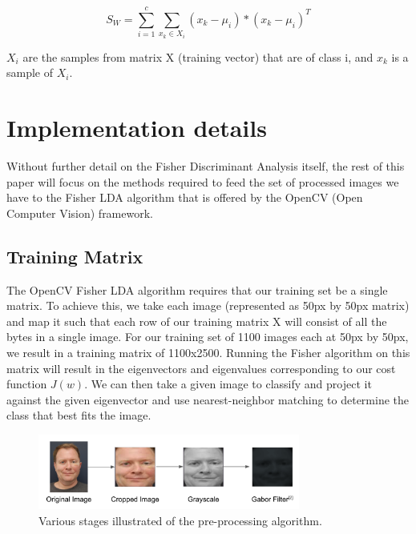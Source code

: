 \documentclass[12pt, conference]{IEEEtran}
\begin{document}
\begin{equation}
	S_W = \sum_{i=1}^{c} \sum_{x_k \in X_i} (x_k - \mu_i) * (x_k - \mu_i)^T
\end{equation}

$X_i$ are the samples from matrix X (training vector) that are of class i, and $x_k$ is a sample of $X_i$.


\section{Implementation details} \label{sec:Basics}
Without further detail on the Fisher Discriminant Analysis itself, the rest of this paper will focus on the methods required to feed the set of processed images we have to the Fisher LDA algorithm that is offered by the OpenCV (Open Computer Vision) framework.  

\subsection{Training Matrix}
The OpenCV Fisher LDA algorithm requires that our training set be a single matrix. To achieve this, we take each image (represented as 50px by 50px matrix) and map it such that each row of our training matrix X will consist of all the bytes in a single image. For our training set of 1100 images each at 50px by 50px, we result in a training matrix of 1100x2500. Running the Fisher algorithm on this matrix will result in the eigenvectors and eigenvalues corresponding to our cost function $J(w)$. We can then take a given image to classify and project it against the given eigenvector and use nearest-neighbor matching to determine the class that best fits the image.

\begin{figure}
\begin{center}
\includegraphics[width=8.6cm]{pictures/imageproc}
\end{center}
\caption{Various stages illustrated of the pre-processing algorithm.}
\label{imageproc}
\end{figure}
\end{document}
